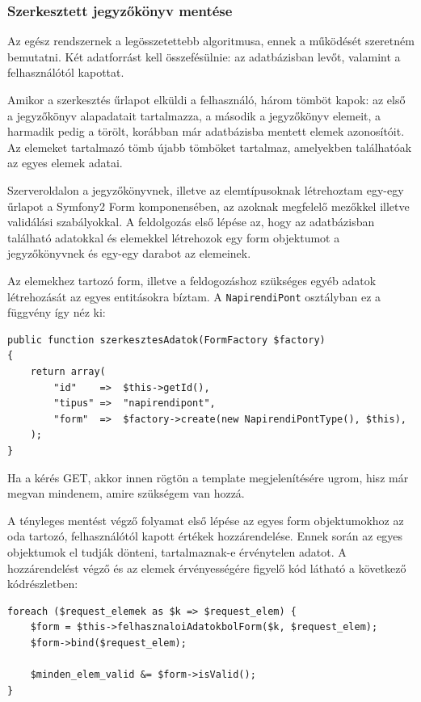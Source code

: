 \documentclass[a4paper,12pt,oneside]{report}
\begin{document}
\subsubsection*{Szerkesztett jegyzőkönyv mentése}

Az egész rendszernek a legösszetettebb algoritmusa, ennek a működését szeretném bemutatni. Két adatforrást kell összefésülnie: az adatbázisban levőt, valamint a felhasználótól kapottat.

Amikor a szerkesztés űrlapot elküldi a felhasználó, három tömböt kapok: az első a jegyzőkönyv alapadatait tartalmazza, a második a jegyzőkönyv elemeit, a harmadik pedig a törölt, korábban már adatbázisba mentett elemek azonosítóit. Az elemeket tartalmazó tömb újabb tömböket tartalmaz, amelyekben találhatóak az egyes elemek adatai.

Szerveroldalon a jegyzőkönyvnek, illetve az elemtípusoknak létrehoztam egy-egy űrlapot a Symfony2 Form komponensében, az azoknak megfelelő mezőkkel illetve validálási szabályokkal. A feldolgozás első lépése az, hogy az adatbázisban található adatokkal és elemekkel létrehozok egy form objektumot a jegyzőkönyvnek és egy-egy darabot az elemeinek.

Az elemekhez tartozó form, illetve a feldogozáshoz szükséges egyéb adatok létrehozását az egyes entitásokra bíztam. A {\tt NapirendiPont} osztályban ez a függvény így néz ki:

\begin{lstlisting}
public function szerkesztesAdatok(FormFactory $factory)
{
    return array(
        "id"    =>  $this->getId(),
        "tipus" =>  "napirendipont",
        "form"  =>  $factory->create(new NapirendiPontType(), $this),
    );
}
\end{lstlisting}

Ha a kérés GET, akkor innen rögtön a template megjelenítésére ugrom, hisz már megvan mindenem, amire szükségem van hozzá.

A tényleges mentést végző folyamat első lépése az egyes form objektumokhoz az oda tartozó, felhasználótól kapott értékek hozzárendelése. Ennek során az egyes objektumok el tudják dönteni, tartalmaznak-e érvénytelen adatot. A hozzárendelést végző és az elemek érvényességére figyelő kód látható a következő kódrészletben:

\begin{lstlisting}
foreach ($request_elemek as $k => $request_elem) {
    $form = $this->felhasznaloiAdatokbolForm($k, $request_elem);
    $form->bind($request_elem);

    $minden_elem_valid &= $form->isValid();
}
\end{lstlisting}
\end{document}
